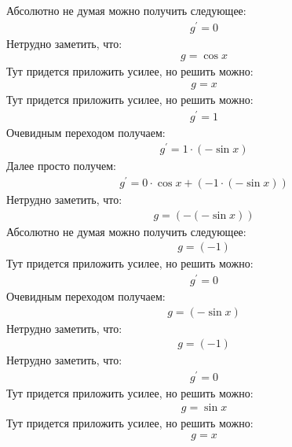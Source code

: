 \documentclass[12pt,a4paper]{scrartcl}
\begin{document}
Абсолютно не думая можно получить следующее:
\begin{gather}\label{eq:f2a584f0}g^\prime  = 0\end{gather}
Нетрудно заметить, что:
\begin{gather}\label{eq:f2a58610}g  =  \cos{ x } \end{gather}
Тут придется приложить усилее, но решить можно:
\begin{gather}\label{eq:f2a58460}g  = x\end{gather}
Тут придется приложить усилее, но решить можно:
\begin{gather}\label{eq:f2a58790}g^\prime  = 1\end{gather}
Очевидным переходом получаем:
\begin{gather}\label{eq:f2a58760}g^\prime  = 1 \cdot  \left(- \sin{ x } \right) \end{gather}
Далее просто получем:
\begin{gather}\label{eq:f2a58220}g^\prime  = 0 \cdot  \cos{ x }  +  \left(-1 \cdot  \left(- \sin{ x } \right) \right) \end{gather}
Нетрудно заметить, что:
\begin{gather}\label{eq:f2a58460}g  =  \left(- \left(- \sin{ x } \right) \right) \end{gather}
Абсолютно не думая можно получить следующее:
\begin{gather}\label{eq:f2a583d0}g  = \left(-1\right)\end{gather}
Тут придется приложить усилее, но решить можно:
\begin{gather}\label{eq:f2a58610}g^\prime  = 0\end{gather}
Очевидным переходом получаем:
\begin{gather}\label{eq:f2a58790}g  =  \left(- \sin{ x } \right) \end{gather}
Нетрудно заметить, что:
\begin{gather}\label{eq:f2a584c0}g  = \left(-1\right)\end{gather}
Нетрудно заметить, что:
\begin{gather}\label{eq:f2a58940}g^\prime  = 0\end{gather}
Тут придется приложить усилее, но решить можно:
\begin{gather}\label{eq:f2a58490}g  =  \sin{ x } \end{gather}
Тут придется приложить усилее, но решить можно:
\begin{gather}\label{eq:f2a58400}g  = x\end{gather}
\end{document}
